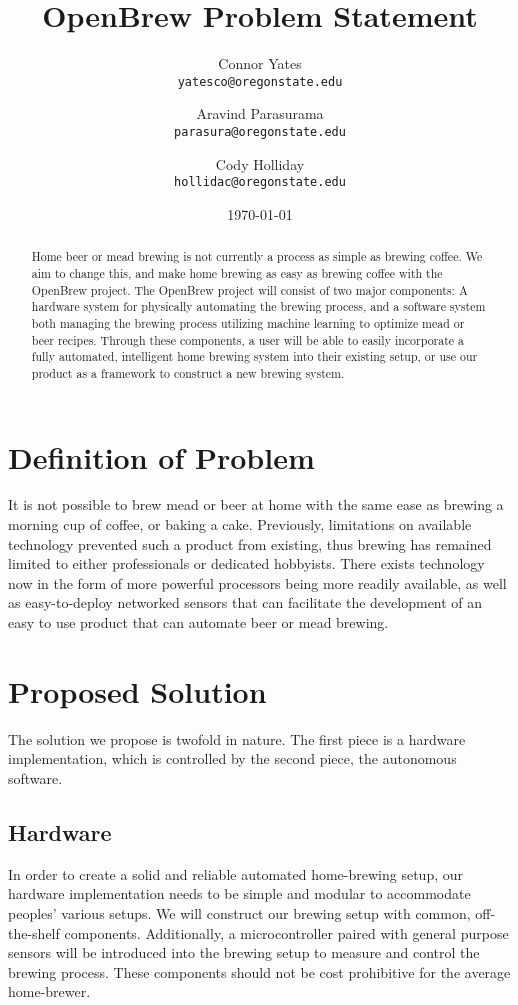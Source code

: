 \documentclass[letterpaper,10pt]{article}
\author{Connor Yates\\
\texttt{yatesco@oregonstate.edu}
\and
Aravind Parasurama\\
\texttt{parasura@oregonstate.edu}
\and
Cody Holliday\\
\texttt{hollidac@oregonstate.edu}}
\date{\today}
\title{OpenBrew Problem Statement}
\begin{document}
\maketitle

\begin{abstract}
	Home beer or mead brewing is not currently a process as simple as brewing
	coffee. We aim to change this, and make home brewing as easy as brewing coffee with the
	OpenBrew project. The OpenBrew project will consist of two major components: A
	hardware system for physically automating the brewing process, and a software system 
	both managing the brewing process utilizing machine learning to optimize mead or beer 
	recipes. Through these components, a user will be able to easily incorporate a fully 
	automated, intelligent home brewing system into their existing setup, or use our 
	product as a framework to construct a new brewing system.
\end{abstract}

\newpage

\section{Definition of Problem}
It is not possible to brew mead or beer at home with the same ease as brewing a morning cup of
coffee, or baking a cake. Previously, limitations on available technology prevented such
a product from existing, thus brewing has remained limited to either professionals or
dedicated hobbyists. There exists technology now in the form of more powerful processors
being more readily available, as well as easy-to-deploy networked sensors that can facilitate
the development of an easy to use product that can automate beer or mead brewing.

\section{Proposed Solution}
The solution we propose is twofold in nature.
The first piece is a hardware implementation, which is controlled by the second piece, 
the autonomous software.

\subsection{Hardware}
In order to create a solid and reliable automated home-brewing setup, our hardware 
implementation needs to be simple and modular to accommodate peoples' various setups.
We will construct our brewing setup with common, off-the-shelf components.
Additionally, a microcontroller paired with general purpose sensors will be 
introduced into the brewing setup to measure and control the brewing process.
These components should not be cost prohibitive for the average home-brewer.
\end{document}
